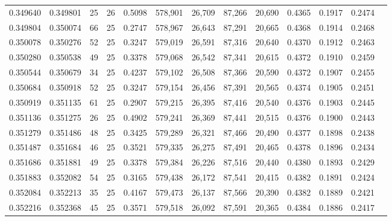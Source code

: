 \begin{tabular}{rrrrrrrrrrrrr}
0.349640 & 0.349801 &    25 &  26 &                                     0.5098 & 578,901 &  26,709 &  87,266 &  20,690 & 0.4365 & 0.1917 & 0.2474 \\
0.349804 & 0.350074 &    66 &  25 &                                     0.2747 & 578,967 &  26,643 &  87,291 &  20,665 & 0.4368 & 0.1914 & 0.2468 \\
0.350078 & 0.350276 &    52 &  25 &                                     0.3247 & 579,019 &  26,591 &  87,316 &  20,640 & 0.4370 & 0.1912 & 0.2463 \\
0.350280 & 0.350538 &    49 &  25 &                                     0.3378 & 579,068 &  26,542 &  87,341 &  20,615 & 0.4372 & 0.1910 & 0.2459 \\
0.350544 & 0.350679 &    34 &  25 &                                     0.4237 & 579,102 &  26,508 &  87,366 &  20,590 & 0.4372 & 0.1907 & 0.2455 \\
0.350684 & 0.350918 &    52 &  25 &                                     0.3247 & 579,154 &  26,456 &  87,391 &  20,565 & 0.4374 & 0.1905 & 0.2451 \\
0.350919 & 0.351135 &    61 &  25 &                                     0.2907 & 579,215 &  26,395 &  87,416 &  20,540 & 0.4376 & 0.1903 & 0.2445 \\
0.351136 & 0.351275 &    26 &  25 &                                     0.4902 & 579,241 &  26,369 &  87,441 &  20,515 & 0.4376 & 0.1900 & 0.2443 \\
0.351279 & 0.351486 &    48 &  25 &                                     0.3425 & 579,289 &  26,321 &  87,466 &  20,490 & 0.4377 & 0.1898 & 0.2438 \\
0.351487 & 0.351684 &    46 &  25 &                                     0.3521 & 579,335 &  26,275 &  87,491 &  20,465 & 0.4378 & 0.1896 & 0.2434 \\
0.351686 & 0.351881 &    49 &  25 &                                     0.3378 & 579,384 &  26,226 &  87,516 &  20,440 & 0.4380 & 0.1893 & 0.2429 \\
0.351883 & 0.352082 &    54 &  25 &                                     0.3165 & 579,438 &  26,172 &  87,541 &  20,415 & 0.4382 & 0.1891 & 0.2424 \\
0.352084 & 0.352213 &    35 &  25 &                                     0.4167 & 579,473 &  26,137 &  87,566 &  20,390 & 0.4382 & 0.1889 & 0.2421 \\
0.352216 & 0.352368 &    45 &  25 &                                     0.3571 & 579,518 &  26,092 &  87,591 &  20,365 & 0.4384 & 0.1886 & 0.2417 \\

\end{tabular}
